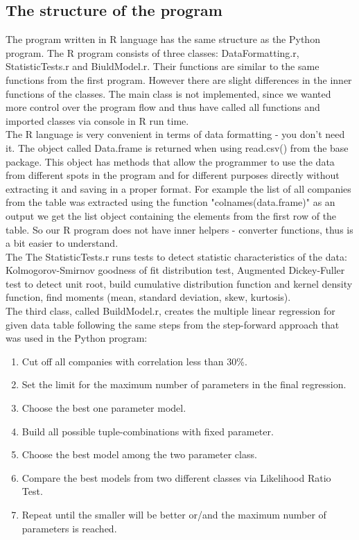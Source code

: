 \documentclass{article}
\begin{document}
\subsection{The structure of the program}
The program written in R language has the same structure as the Python program. The R program consists of three classes: DataFormatting.r, StatisticTests.r and BiuldModel.r. Their functions are similar to the same functions from the first program. However there are slight differences in the inner functions of the classes. The main class is not implemented, since we wanted more control over the program flow and thus have called all functions and imported classes via console in R run time.\\
The R language is very convenient in terms of data formatting - you don't need it. The object called Data.frame is returned when using read.csv() from the base package. This object has methods that allow the programmer to use the data from different spots in the program and for different purposes directly without extracting it and saving in a proper format. For example the list of all companies from the table was extracted using the function "colnames(data.frame)" as an output we get the list object containing the elements from the first row of the table. So our R program does not have inner helpers - converter functions, thus is a bit easier to understand.\\
The The StatisticTests.r runs tests to detect statistic characteristics of the data: Kolmogorov-Smirnov goodness of fit distribution test, Augmented Dickey-Fuller test to detect unit root, build cumulative distribution function and kernel density function, find moments (mean, standard deviation, skew, kurtosis).\\
The third class, called BuildModel.r, creates the multiple linear regression for given data table following the same steps from the step-forward approach that was used in the Python program:
\begin{enumerate}
    \item Cut off all companies with correlation less than 30\%.
    \item Set the limit for the maximum number of parameters in the final regression. 
    \item Choose the best one parameter model.
    \item Build all possible tuple-combinations with fixed parameter.
    \item Choose the best model among the two parameter class.
    \item Compare the best models from two different classes via Likelihood Ratio Test.
    \item Repeat until the smaller will be better or/and the maximum number of parameters is reached.
\end{enumerate}
\end{document}
